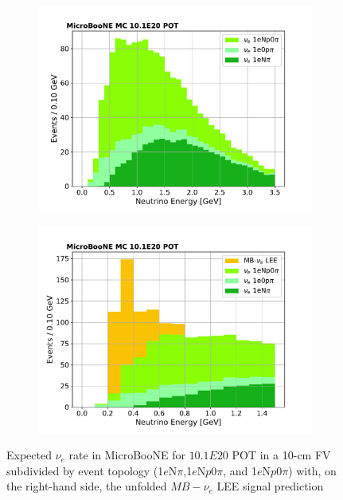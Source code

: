 \documentclass[a4paper]{article}
\begin{document}
\begin{figure}[H] 
\begin{center}
    \begin{subfigure}[b]{0.45\textwidth}
    \centering
    \includegraphics[width=1.00\textwidth]{introduction/nue_rate_MCC9.pdf}
    \end{subfigure}
    \begin{subfigure}[b]{0.45\textwidth}
    \centering
    \includegraphics[width=1.00\textwidth]{introduction/nue_rate_MCC9_LEE.pdf}
    \end{subfigure}
\caption{\label{fig:nuerate}Expected $\nu_e$ rate in MicroBooNE for $10.1E20$ POT in a 10-cm FV subdivided by event topology (1$e$N$\pi$,1$e$N$p$0$\pi$, and 1$e$N$p$0$\pi$) with, on the right-hand side, the unfolded $MB-\nu_e$ LEE signal prediction}
\end{center}
\end{figure}
\end{document}

